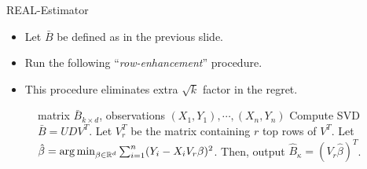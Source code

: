 \documentclass{beamer}
\def\BH{\widehat{B}}
\def\Bbar{\bar{B}}
\def\Bhat{\BH}
\def\Bhat{\widehat{B}}
\def\Bbar{\bar{B}}
\begin{document}
\begin{frame}{REAL-Estimator}
\begin{itemize}
    \item Let $\bar{B}$ be defined as in the previous slide.
    \vskip5mm
    \item Run the following ``\emph{row-enhancement}'' procedure.
    \vskip5mm
    \item This procedure eliminates extra $\sqrt k$ factor in the regret.
\end{itemize}
\begin{figure}
    \begin{algorithmic}[1]
    \REQUIRE matrix $\Bbar_{k\times d}$, observations $(X_1,Y_1),\cdots,(X_{n},Y_{n})$
    \STATE Compute SVD $\Bbar=UDV^T$.
    \STATE Let $V_r^T$ be the matrix containing $r$ top rows of $V^T$.
    \STATE Let $\hat\beta=\operatorname*{arg\,min}_{\beta\in\mathbb{R}^d}\sum_{i=1}^{n}(Y_i-X_iV_r\beta)^2$.
    \STATE Then, output $\Bhat_\kappa=(V_r\hat\beta)^T$.
    \end{algorithmic}
\end{figure}
\end{frame}
\end{document}
